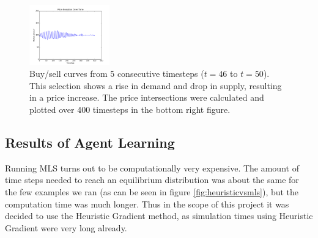 \documentclass[11pt]{article}
\begin{document}
\begin{figure}
  \includegraphics[width=0.31\textwidth]{figures/price_history.png}
  \caption[Price Evolution]{Buy/sell curves from 5 consecutive timesteps ($t=46$ to $t=50$). This selection shows a rise in demand and drop in supply, resulting in a price increase. The price intersections were calculated and plotted over 400 timesteps in the bottom right figure.}
  \label{fig:singleStep}
\end{figure}

\subsection{Results of Agent Learning}
Running MLS turns out to be computationally very expensive. The amount of time steps needed to reach an equilibrium distribution was about the same for the few examples we ran (as can be seen in figure \ref{fig:heuristicvsmls}), but the computation time was much longer. Thus in the scope of this project it was decided to use the Heuristic Gradient method, as simulation times using Heuristic Gradient were very long already. \\
\end{document}
